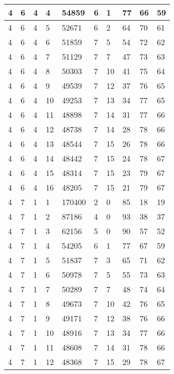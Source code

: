 \begin{table}[!ht]
\begin{tabular}{|l|l|l|l|l|l|l|l|l|l|}
        4 & 6 & 4 & 4 & 54859 & 6 & 1 & 77 & 66 & 59 \\ \hline
        4 & 6 & 4 & 5 & 52671 & 6 & 2 & 64 & 70 & 61 \\ \hline
        4 & 6 & 4 & 6 & 51859 & 7 & 5 & 54 & 72 & 62 \\ \hline
        4 & 6 & 4 & 7 & 51129 & 7 & 7 & 47 & 73 & 63 \\ \hline
        4 & 6 & 4 & 8 & 50303 & 7 & 10 & 41 & 75 & 64 \\ \hline
        4 & 6 & 4 & 9 & 49539 & 7 & 12 & 37 & 76 & 65 \\ \hline
        4 & 6 & 4 & 10 & 49253 & 7 & 13 & 34 & 77 & 65 \\ \hline
        4 & 6 & 4 & 11 & 48898 & 7 & 14 & 31 & 77 & 66 \\ \hline
        4 & 6 & 4 & 12 & 48738 & 7 & 14 & 28 & 78 & 66 \\ \hline
        4 & 6 & 4 & 13 & 48544 & 7 & 15 & 26 & 78 & 66 \\ \hline
        4 & 6 & 4 & 14 & 48442 & 7 & 15 & 24 & 78 & 67 \\ \hline
        4 & 6 & 4 & 15 & 48314 & 7 & 15 & 23 & 79 & 67 \\ \hline
        4 & 6 & 4 & 16 & 48205 & 7 & 15 & 21 & 79 & 67 \\ \hline
        4 & 7 & 1 & 1 & 170400 & 2 & 0 & 85 & 18 & 19 \\ \hline
        4 & 7 & 1 & 2 & 87186 & 4 & 0 & 93 & 38 & 37 \\ \hline
        4 & 7 & 1 & 3 & 62156 & 5 & 0 & 90 & 57 & 52 \\ \hline
        4 & 7 & 1 & 4 & 54205 & 6 & 1 & 77 & 67 & 59 \\ \hline
        4 & 7 & 1 & 5 & 51837 & 7 & 3 & 65 & 71 & 62 \\ \hline
        4 & 7 & 1 & 6 & 50978 & 7 & 5 & 55 & 73 & 63 \\ \hline
        4 & 7 & 1 & 7 & 50289 & 7 & 7 & 48 & 74 & 64 \\ \hline
        4 & 7 & 1 & 8 & 49673 & 7 & 10 & 42 & 76 & 65 \\ \hline
        4 & 7 & 1 & 9 & 49171 & 7 & 12 & 38 & 76 & 66 \\ \hline
        4 & 7 & 1 & 10 & 48916 & 7 & 13 & 34 & 77 & 66 \\ \hline
        4 & 7 & 1 & 11 & 48608 & 7 & 14 & 31 & 78 & 66 \\ \hline
        4 & 7 & 1 & 12 & 48368 & 7 & 15 & 29 & 78 & 67 \\ \hline

\end{tabular}
\end{table}
